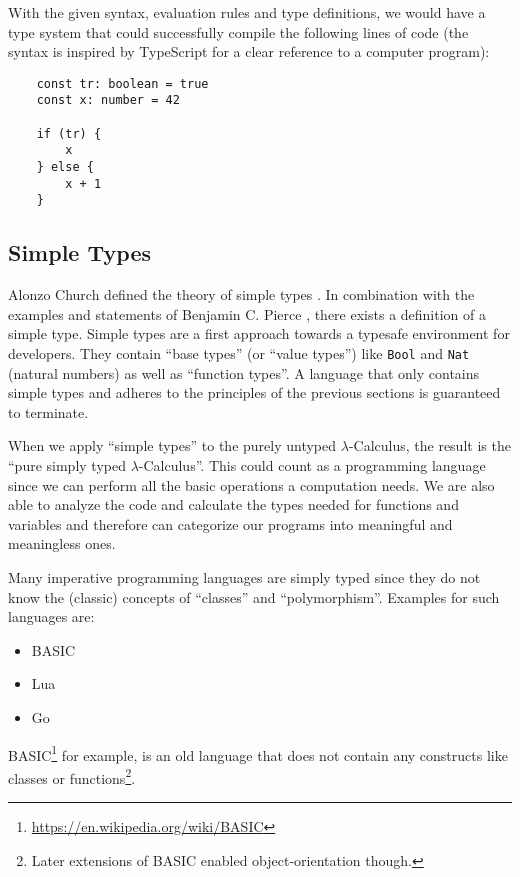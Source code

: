 With the given syntax, evaluation rules and type definitions, we would
have a type system that could successfully compile the following
lines of code (the syntax is inspired by TypeScript for a clear
reference to a computer program):

\begin{verbatim}
    const tr: boolean = true
    const x: number = 42

    if (tr) {
        x
    } else {
        x + 1
    }
\end{verbatim}

\subsection{Simple Types}

Alonzo Church defined the theory of simple types
\cite{churchLogic}. In combination with the examples and
statements of Benjamin C. Pierce \cite{pierce2002ProgLang}, there
exists a definition of a simple type. Simple types are a first
approach towards a typesafe environment for developers. They
contain ``base types'' (or ``value types'') like \texttt{Bool} and
\texttt{Nat} (natural numbers) as well as ``function types''.
A language that only contains simple types and adheres to
the principles of the previous sections is guaranteed to terminate.

When we apply ``simple types'' to the purely untyped
$\lambda$-Calculus, the result is the ``pure simply typed $\lambda$-Calculus''.
This could count as a programming language since we can perform
all the basic operations a computation needs. We are also able to analyze
the code and calculate the types needed for functions and variables
and therefore can categorize our programs into meaningful and
meaningless ones.

Many imperative programming languages are simply typed since they do not
know the (classic) concepts of ``classes'' and ``polymorphism''. Examples for such languages
are:

\begin{itemize}
    \item BASIC
    \item Lua
    \item Go
\end{itemize}

BASIC\footnote{\url{https://en.wikipedia.org/wiki/BASIC}} for example, is an
old language that does not contain any constructs like classes or
functions\footnote{Later extensions of BASIC enabled object-orientation though.}.

